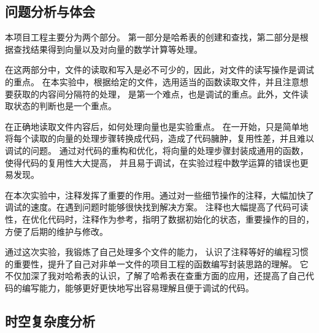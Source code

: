 \subsection{问题分析与体会}\label{subsec:analysis}
{{本项目工程主要分为两个部分。
第一部分是哈希表的创建和查找，第二部分是根据查找结果得到向量以及对向量的数学计算等处理。}}

{在这两部分中，文件的读取和写入是必不可少的，因此，对文件的读写操作是调试的重点。
在本实验中，根据给定的文件，选用适当的函数读取文件，并且注意想要获取的内容间分隔符的处理，
是第一个难点，也是调试的重点。此外，文件读取状态的判断也是一个重点。}

{{在正确地读取文件内容后，如何处理向量也是实验重点。
在一开始，只是简单地将每个读取的向量的处理步骤转换成代码，造成了代码臃肿，复用性差，并且难以调试的问题。
通过对代码的重构和优化，将向量的处理步骤封装成通用的函数，使得代码的复用性大大提高，
并且易于调试，在实验过程中数学运算的错误也更易发现。}}

{{在本次实验中，注释发挥了重要的作用。通过对一些细节操作的注释，大幅加快了调试的速度。在遇到问题时能够很快找到解决方案。
注释也大幅提高了代码可读性，在优化代码时，注释作为参考，指明了数据初始化的状态，重要操作的目的，方便了后期的维护与修改。}}

{{通过这次实验，我锻炼了自己处理多个文件的能力，
认识了注释等好的编程习惯的重要性，提升了自己对非单一文件的项目工程的函数编写封装思路的理解。
它不仅加深了我对哈希表的认识，了解了哈希表在查重方面的应用，还提高了自己代码的编写能力，能够更好更快地写出容易理解且便于调试的代码。}}

\subsection{时空复杂度分析}\label{subsec:analysis2}
